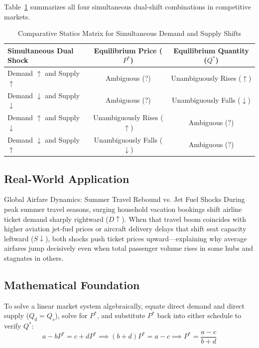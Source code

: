 \documentclass[11pt,letterpaper]{article}
\begin{document}
Table~\ref{tab:dual_shocks} summarizes all four simultaneous dual-shift combinations in competitive markets.

\begin{table}[htbp]
\centering
\caption{Comparative Statics Matrix for Simultaneous Demand and Supply Shifts}
\label{tab:dual_shocks}
\begin{tabular}{|l|c|c|}
\hline
\textbf{Simultaneous Dual Shock} & \textbf{Equilibrium Price ($P^*$)} & \textbf{Equilibrium Quantity ($Q^*$)} \\
\hline
Demand $\uparrow$ and Supply $\uparrow$ & Ambiguous ($?$) & Unambiguously Rises ($\uparrow$) \\
Demand $\downarrow$ and Supply $\downarrow$ & Ambiguous ($?$) & Unambiguously Falls ($\downarrow$) \\
Demand $\uparrow$ and Supply $\downarrow$ & Unambiguously Rises ($\uparrow$) & Ambiguous ($?$) \\
Demand $\downarrow$ and Supply $\uparrow$ & Unambiguously Falls ($\downarrow$) & Ambiguous ($?$) \\
\hline
\end{tabular}
\end{table}

\subsection*{Real-World Application}
\begin{examplecase}{Global Airfare Dynamics: Summer Travel Rebound vs. Jet Fuel Shocks}
During peak summer travel seasons, surging household vacation bookings shift airline ticket demand sharply rightward ($D \uparrow$). When that travel boom coincides with higher aviation jet-fuel prices or aircraft delivery delays that shift seat capacity leftward ($S \downarrow$), both shocks push ticket prices upward—explaining why average airfares jump decisively even when total passenger volume rises in some hubs and stagnates in others.
\end{examplecase}

\subsection*{Mathematical Foundation}
To solve a linear market system algebraically, equate direct demand and direct supply ($Q_d = Q_s$), solve for $P^*$, and substitute $P^*$ back into either schedule to verify $Q^*$:
\begin{equation}
a - bP^* = c + dP^* \implies (b + d)P^* = a - c \implies P^* = \frac{a - c}{b + d}
\end{equation}
\end{document}
